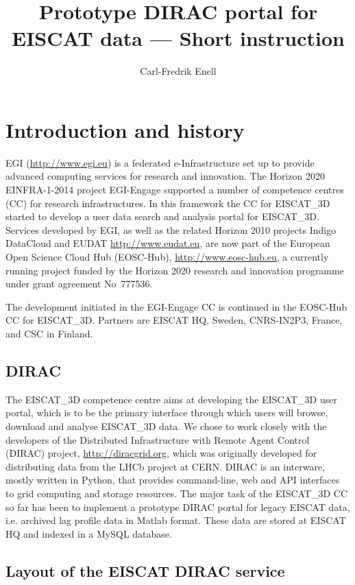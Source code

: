 \documentclass[a4paper]{article}
\title{Prototype DIRAC portal for EISCAT data --- Short instruction}
\author{Carl-Fredrik Enell}
\newcommand{\etd}{EISCAT\_3D}
\begin{document}
\maketitle{}

\section{Introduction and history}
\label{sec:intro}

EGI (\url{http://www.egi.eu}) is a federated e-Infrastructure set up
to provide advanced computing services for research and innovation.
The Horizon 2020 EINFRA-1-2014 project EGI-Engage supported a number
of competence centres (CC) for research infrastructures. In this
framework the CC for \etd{} started to develop a user data search and
analysis portal for \etd{}. Services developed by EGI, as well as the
related Horizon 2010 projects Indigo DataCloud and EUDAT
\url{http://www.eudat.eu}, are now part of the European Open Science
Cloud Hub (EOSC-Hub), \url{http://www.eosc-hub.eu}, a currently
running project funded by the Horizon 2020 research and innovation
programme under grant agreement No~777536.

The development initiated in the EGI-Engage CC is continued in the EOSC-Hub CC for \etd{}. Partners are EISCAT HQ, Sweden, CNRS-IN2P3, France, and CSC in Finland.

\subsection{DIRAC}
\label{sec:dirac}
The \etd{} competence centre aims at developing the \etd{} user
portal, which is to be the primary interface through which users will
browse, download and analyse \etd{} data.  We chose to work closely
with the developers of the Distributed Infrastructure with Remote
Agent Control (DIRAC) project, \url{http://diracgrid.org}, which was
originally developed for distributing data from the LHCb project at
CERN. DIRAC is an interware, mostly written in Python, that provides
command-line, web and API interfaces to grid computing and storage
resources. The major task of the \etd{} CC so far has been to
implement a prototype DIRAC portal for legacy EISCAT data,
i.e. archived lag profile data in Matlab format. These data are stored
at EISCAT HQ and indexed in a MySQL database.

\subsection{Layout of the EISCAT DIRAC service}
\label{sec:eiscat-dirac}
\end{document}
